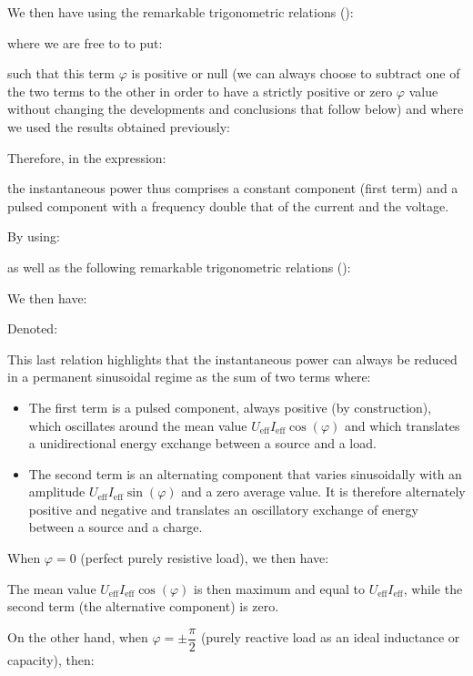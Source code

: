 	We then have using the remarkable trigonometric relations ():
	
	where we are free to to put:
	
	such that this term $\varphi$ is positive or null (we can always choose to subtract one of the two terms to the other in order to have a strictly positive or zero $\varphi$ value without changing the developments and conclusions that follow below) and where we used the results obtained previously:
	
	Therefore, in the expression:
	
	the instantaneous power thus comprises a constant component (first term) and a pulsed component with a frequency double that of the current and the voltage. 

	By using:
	
	as well as the following remarkable trigonometric relations ():
	
	We then have:
	
	Denoted:
	
	This last relation highlights that the instantaneous power can always be reduced in a permanent sinusoidal regime as the sum of two terms where:
	\begin{itemize}
		\item The first term is a pulsed component, always positive (by construction), which oscillates around the mean value $U_\text{eff}I_\text{eff}\cos(\varphi)$ and which translates a unidirectional energy exchange between a source and a load.

		\item The second term is an alternating component that varies sinusoidally with an amplitude $U_\text{eff}I_\text{eff}\sin(\varphi)$  and a zero average value. It is therefore alternately positive and negative and translates an oscillatory exchange of energy between a source and a charge.
	\end{itemize}

	When $\varphi=0$ (perfect purely resistive load), we then have:
	
	The mean value $U_\text{eff}I_\text{eff}\cos(\varphi)$ is then maximum and equal to $U_\text{eff}I_\text{eff}$, while the second term (the alternative component) is zero.

	On the other hand, when $\varphi=\pm\dfrac{\pi}{2}$ (purely reactive load as an ideal inductance or capacity), then:
	
